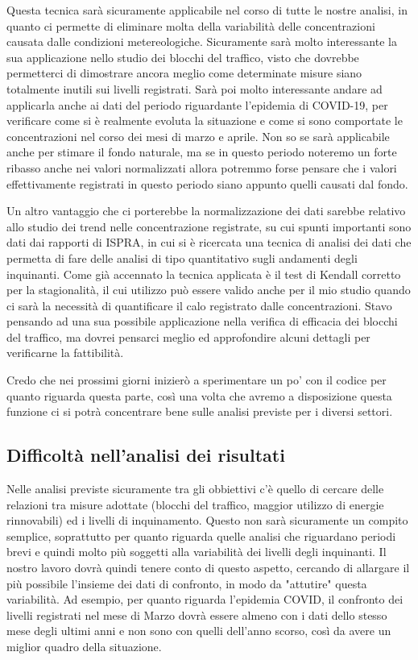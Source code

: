\documentclass{article}
\begin{document}
Questa tecnica sarà sicuramente applicabile nel corso di tutte le nostre analisi, in quanto ci permette di eliminare molta della variabilità delle concentrazioni causata dalle condizioni metereologiche. Sicuramente sarà molto interessante la sua applicazione nello studio dei blocchi del traffico, visto che dovrebbe permetterci di dimostrare ancora meglio come determinate misure siano totalmente inutili sui livelli registrati. Sarà poi molto interessante andare ad applicarla anche ai dati del periodo riguardante l'epidemia di COVID-19, per verificare come si è realmente evoluta la situazione e come si sono comportate le concentrazioni nel corso dei mesi di marzo e aprile. Non so se sarà applicabile anche per stimare il fondo naturale, ma se in questo periodo noteremo un forte ribasso anche nei valori normalizzati allora potremmo forse pensare che i valori effettivamente registrati in questo periodo siano appunto quelli causati dal fondo.

Un altro vantaggio che ci porterebbe la normalizzazione dei dati sarebbe relativo allo studio dei trend nelle concentrazione registrate, su cui spunti importanti sono dati dai rapporti di ISPRA\cite{cattani2018analisi}\cite{cattani2014analisi}, in cui si è ricercata una tecnica di analisi dei dati che permetta di fare delle analisi di tipo quantitativo sugli andamenti degli inquinanti. Come già accennato la tecnica applicata è il test di Kendall corretto per la stagionalità, il cui utilizzo può essere valido anche per il mio studio quando ci sarà la necessità di quantificare il calo registrato dalle concentrazioni. Stavo pensando ad una sua possibile applicazione nella verifica di efficacia dei blocchi del traffico, ma dovrei pensarci meglio ed approfondire alcuni dettagli per verificarne la fattibilità. 

Credo che nei prossimi giorni inizierò a sperimentare un po' con il codice per quanto riguarda questa parte, così una volta che avremo a disposizione questa funzione ci si potrà concentrare bene sulle analisi previste per i diversi settori.

\subsection{Difficoltà nell'analisi dei risultati}
Nelle analisi previste sicuramente tra gli obbiettivi c'è quello di cercare delle relazioni tra misure adottate (blocchi del traffico, maggior utilizzo di energie rinnovabili) ed i livelli di inquinamento. Questo non sarà sicuramente un compito semplice, soprattutto per quanto riguarda quelle analisi che riguardano periodi brevi e quindi molto più soggetti alla variabilità dei livelli degli inquinanti. Il nostro lavoro dovrà quindi tenere conto di questo aspetto, cercando di allargare il più possibile l'insieme dei dati di confronto, in modo da "attutire" questa variabilità. Ad esempio, per quanto riguarda l'epidemia COVID, il confronto dei livelli registrati nel mese di Marzo dovrà essere almeno con i dati dello stesso mese degli ultimi anni e non sono con quelli dell'anno scorso, così da avere un miglior quadro della situazione.
\end{document}
